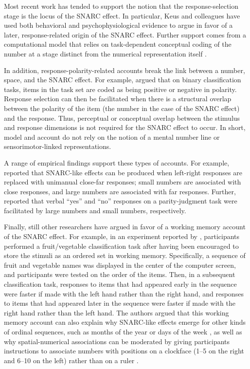 \documentclass[man,floatsintext]{apa6}
\theoremstyle{definition}
\theoremstyle{definition}
\theoremstyle{definition}
\theoremstyle{remark}
\begin{document}
Most recent work has tended to support the notion that the
response-selection stage is the locus of the SNARC effect. In
particular, Keus and colleagues have used both behavioral
\autocite{Keus:2005ho} and psychophysiological \autocite{Keus:2005jh}
evidence to argue in favor of a later, response-related origin of the
SNARC effect. Further support comes from a computational model that
relies on task-dependent conceptual coding of the number at a stage
distinct from the numerical representation itself
\autocite{Gevers:2006model}.

In addition, response-polarity-related accounts break the link between a
number, space, and the SNARC effect. For example,
\textcite{Proctor:2006jv} argued that on binary classification tasks,
items in the task set are coded as being positive or negative in
polarity. Response selection can then be facilitated when there is a
structural overlap between the polarity of the item (the number in the
case of the SNARC effect) and the response. Thus, perceptual or
conceptual overlap between the stimulus and response dimensions is not
required for the SNARC effect to occur. In short,
\textcite{Gevers:2006model} model and \textcite{Proctor:2006jv} account
do not rely on the notion of a mental number line or sensorimotor-linked
representations.

A range of empirical findings support these types of accounts. For
example, \textcite{Santens:2008} reported that SNARC-like effects can be
produced when left-right responses are replaced with unimanual close-far
responses; small numbers are associated with close responses, and large
numbers are associated with far responses. Further,
\textcite{Landy:2008} reported that verbal \enquote{yes} and
\enquote{no} responses on a parity-judgment task were facilitated by
large numbers and small numbers, respectively.

Finally, still other researchers have argued in favor of a working
memory account of the SNARC effect. For example, in an experiment
reported by \textcite{vanDijck:2011kk}, participants performed a
fruit/vegetable classification task after having been encouraged to
store the stimuli as an ordered set in working memory. Specifically, a
sequence of fruit and vegetable names was displayed in the center of the
computer screen, and participants were tested on the order of the items.
Then, in a subsequent classification task, responses to items that had
appeared early in the sequence were faster if made with the left hand
rather than the right hand, and responses to items that had appeared
later in the sequence were faster if made with the right hand rather
than the left hand. The authors argued that this working memory account
can also explain why SNARC-like effects emerge for other kinds of
ordinal sequences, such as months of the year \autocite{Gevers:2003je}
or days of the week \autocite{Gevers:2004gj}, as well as why
spatial-numerical associations can be moderated by giving participants
instructions to associate numbers with positions on a clockface (1--5 on
the right and 6--10 on the left) rather than on a ruler \autocite[1--5
on the left and 6--10 on the right;][]{Bachtold:1998}.
\end{document}
